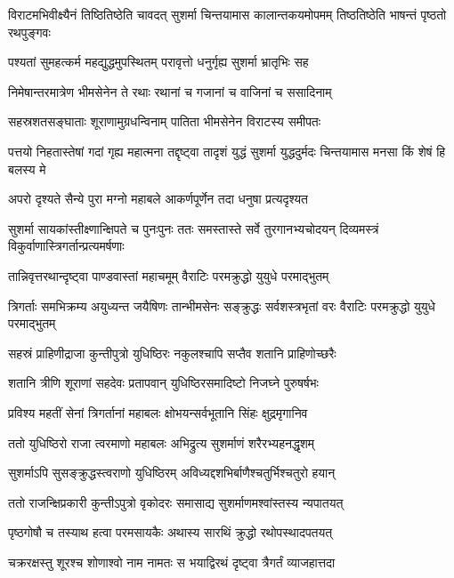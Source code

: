 \onelineshloka
{विराटमभिवीक्ष्यैनं तिष्ठितिष्ठेति चावदत्}
\twolineshloka
{सुशर्मा चिन्तयामास कालान्तकयमोपमम्}
{तिष्ठतिष्ठेति भाषन्तं पृष्ठतो रथपुङ्गवः}


\twolineshloka
{पश्यतां सुमहत्कर्म महद्युद्धमुपस्थितम्}
{परावृत्तो धनुर्गृह्य सुशर्मा भ्रातृभिः सह}


\twolineshloka
{निमेषान्तरमात्रेण भीमसेनेन ते रथाः}
{रथानां च गजानां च वाजिनां च ससादिनाम्}


\twolineshloka
{सहस्रशतसङ्घाताः शूराणामुग्रधन्विनाम्}
{पातिता भीमसेनेन विराटस्य समीपतः}


\onelineshloka
{पत्तयो निहतास्तेषां गदां गृह्य महात्मना}
\twolineshloka
{तद्दृष्ट्वा तादृशं युद्धं सुशर्मा युद्धदुर्मदः}
{चिन्तयामास मनसा किं शेषं हि बलस्य मे}


\twolineshloka
{अपरो दृश्यते सैन्ये पुरा मग्नो महाबले}
{आकर्णपूर्णेन तदा धनुषा प्रत्यदृश्यत}


\onelineshloka
{सुशर्मा सायकांस्तीक्ष्णान्क्षिपते च पुनःपुनः}
\twolineshloka
{ततः समस्तास्ते सर्वे तुरगानभ्यचोदयन्}
{दिव्यमस्त्रं विकुर्वाणास्त्रिगर्तान्प्रत्यमर्षणाः}


\twolineshloka
{तान्निवृत्तरथान्दृष्ट्वा पाण्डवास्तां महाचमूम्}
{वैराटिः परमक्रुद्धो युयुधे परमाद्भुतम्}


\threelineshloka
{त्रिगर्ताः समभिक्रम्य अयुध्यन्त जयैषिणः}
{तान्भीमसेनः सङ्क्रुद्धः सर्वशस्त्रभृतां वरः}
{वैराटिः परमक्रुद्धो युयुधे परमाद्भुतम्}


\twolineshloka
{सहस्रं प्राहिणीद्राजा कुन्तीपुत्रो युधिष्ठिरः}
{नकुलश्चापि सप्तैव शतानि प्राहिणोच्छरैः}


\twolineshloka
{शतानि त्रीणि शूराणां सहदेवः प्रतापवान्}
{युधिष्ठिरसमादिष्टो निजघ्ने पुरुषर्षभः}


\twolineshloka
{प्रविश्य महतीं सेनां त्रिगर्तानां महाबलः}
{क्षोभयन्सर्वभूतानि सिंहः क्षुद्रमृगानिव}


\twolineshloka
{ततो युधिष्ठिरो राजा त्वरमाणो महाबलः}
{अभिद्रुत्य सुशर्माणं शरैरभ्यहनद्धृशम्}


\twolineshloka
{सुशर्माऽपि सुसङ्क्रुद्धस्त्वराणो युधिष्ठिरम्}
{अविध्यद्दशभिर्बाणैश्चतुर्भिश्चतुरो हयान्}


\twolineshloka
{ततो राजन्क्षिप्रकारी कुन्तीऽपुत्रो वृकोदरः}
{समासाद्य सुशर्माणमश्वांस्तस्य न्यपातयत्}


\twolineshloka
{पृष्ठगोषौ च तस्याथ हत्वा परमसायकैः}
{अथास्य सारथिं क्रुद्धो रथोपस्थादपतयत्}


\twolineshloka
{चक्ररक्षस्तु शूरश्च शोणाश्वो नाम नामतः}
{स भयाद्विरथं दृष्ट्वा त्रैगर्तं व्याजहात्तदा}


